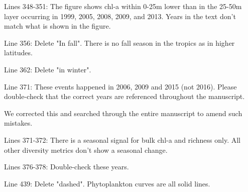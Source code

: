 \documentclass[12pt,english]{reviewresponse}
\begin{document}
\begin{revcomment}
Lines 348-351: The figure shows chl-a within 0-25m lower than in the 25-50m layer occurring in 1999, 2005, 2008, 2009, and 2013. Years in the text don't match what is shown in the figure.
\end{revcomment}
\begin{revresponse}
\end{revresponse}

\begin{revcomment}
Line 356: Delete "In fall". There is no fall season in the tropics as in higher latitudes.
\end{revcomment}
\begin{revresponse}
\end{revresponse}

\begin{revcomment}
Line 362: Delete "in winter".
\end{revcomment}
\begin{revresponse}
\end{revresponse}

\begin{revcomment}
Line 371: These events happened in 2006, 2009 and 2015 (not 2016). Please double-check that the correct years are referenced throughout the manuscript.
\end{revcomment}
\begin{revresponse}
	We corrected this and searched through the entire manuscript to amend such mistakes.
\end{revresponse}

\begin{revcomment}
Lines 371-372: There is a seasonal signal for bulk chl-a and richness only. All other diversity metrics don't show a seasonal change.
\end{revcomment}
\begin{revresponse}
\end{revresponse}

\begin{revcomment}
Lines 376-378: Double-check these years.
\end{revcomment}
\begin{revresponse}
\end{revresponse}

\begin{revcomment}
Line 439: Delete "dashed". Phytoplankton curves are all solid lines.
\end{revcomment}
\begin{revresponse}
\end{revresponse}
\end{document}
